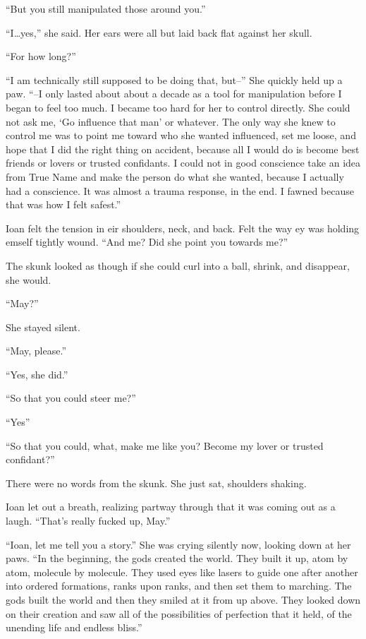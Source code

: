 ``But you still manipulated those around you.''

``I\ldots yes,'' she said. Her ears were all but laid back flat against her skull.

``For how long?''

``I am technically still supposed to be doing that, but--'' She quickly held up a paw. ``--I only lasted about about a decade as a tool for manipulation before I began to feel too much. I became too hard for her to control directly. She could not ask me, `Go influence that man' or whatever. The only way she knew to control me was to point me toward who she wanted influenced, set me loose, and hope that I did the right thing on accident, because all I would do is become best friends or lovers or trusted confidants. I could not in good conscience take an idea from True Name and make the person do what she wanted, because I actually had a conscience. It was almost a trauma response, in the end. I fawned because that was how I felt safest.''

Ioan felt the tension in eir shoulders, neck, and back. Felt the way ey was holding emself tightly wound. ``And me? Did she point you towards me?''

The skunk looked as though if she could curl into a ball, shrink, and disappear, she would.

``May?''

She stayed silent.

``May, please.''

``Yes, she did.''

``So that you could steer me?''

``Yes''

``So that you could, what, make me like you? Become my lover or trusted confidant?''

There were no words from the skunk. She just sat, shoulders shaking.

Ioan let out a breath, realizing partway through that it was coming out as a laugh. ``That's really fucked up, May.''

``Ioan, let me tell you a story.'' She was crying silently now, looking down at her paws. ``In the beginning, the gods created the world. They built it up, atom by atom, molecule by molecule. They used eyes like lasers to guide one after another into ordered formations, ranks upon ranks, and then set them to marching. The gods built the world and then they smiled at it from up above. They looked down on their creation and saw all of the possibilities of perfection that it held, of the unending life and endless bliss.''

